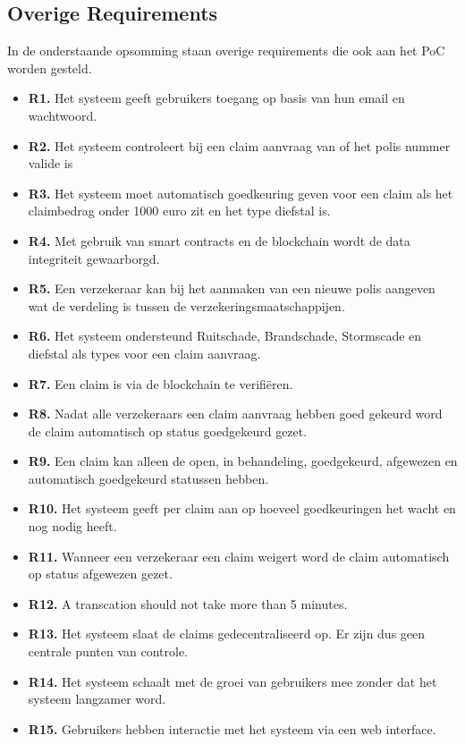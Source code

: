 \subsection{Overige Requirements}
In de onderstaande opsomming staan overige requirements die ook aan het PoC worden gesteld.
\begin{itemize}
  \item \textbf{R1.} Het systeem geeft gebruikers toegang op basis van hun email en wachtwoord.
  \item \textbf{R2.} Het systeem controleert bij een claim aanvraag van of het polis nummer valide is
  \item \textbf{R3.} Het systeem moet automatisch goedkeuring geven voor een claim als het claimbedrag onder 1000 euro zit en het type diefstal is.
  \item \textbf{R4.} Met gebruik van smart contracts en de blockchain wordt de data integriteit gewaarborgd.
  \item \textbf{R5.} Een verzekeraar kan bij het aanmaken van een nieuwe polis aangeven wat de verdeling is tussen de verzekeringsmaatschappijen.
  \item \textbf{R6.} Het systeem ondersteund Ruitschade, Brandschade, Stormscade en diefstal als types voor een claim aanvraag.
  \item \textbf{R7.} Een claim is via de blockchain te verifiëren.
  \item \textbf{R8.} Nadat alle verzekeraars een claim aanvraag hebben goed gekeurd word de claim automatisch op status goedgekeurd gezet.
  \item \textbf{R9.} Een claim kan alleen de open, in behandeling, goedgekeurd, afgewezen en automatisch goedgekeurd statussen hebben.
  \item \textbf{R10.} Het systeem geeft per claim aan op hoeveel goedkeuringen het wacht en nog nodig heeft.
  \item \textbf{R11.} Wanneer een verzekeraar een claim weigert word de claim automatisch op status afgewezen gezet.
  \item \textbf{R12.} A transcation should not take more than 5 minutes.
  \item \textbf{R13.} Het systeem slaat de claims gedecentraliseerd op. Er zijn dus geen centrale punten van controle.
  \item \textbf{R14.} Het systeem schaalt met de groei van gebruikers mee zonder dat het systeem langzamer word.
  \item \textbf{R15.} Gebruikers hebben interactie met het systeem via een web interface.
\end{itemize}
\newpage

